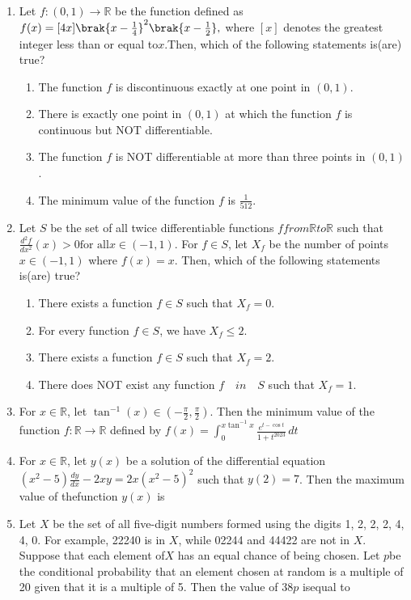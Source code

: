 \documentclass[12pt,a4paper]{article}
\begin{document}
\begin{enumerate}
\item Let $f : (0,1) \to \mathbb{R}$ be the function defined as $ f(x) =  [4x] \brak{x-\frac{1}{4}}^2 \brak{x-\frac{1}{2}},$ where $[x]$ denotes the greatest integer less than or equal to$x.$Then, which of the following statements is(are) true?
\begin{enumerate}
\item The function $f$ is discontinuous exactly at one point in $(0,1)$.
\item There is exactly one point in $(0,1)$ at which the function $f$ is continuous but NOT differentiable.
\item The function $f$ is NOT differentiable at more than three points in $(0,1)$.
\item The minimum value of the function $f$ is $\frac{1}{512}$.
\end{enumerate}

\item Let $S$ be the set of all twice differentiable functions $f from \mathbb{R} to \mathbb{R}$ such that $ \frac{d^2 f}{dx^2}(x) > 0  \text{for all}  x \in (-1, 1).$ For $f \in S$, let ${X_{f}}$ be the number of points $x \in (-1, 1)$ where $f(x) = x$. Then, which of the following statements is(are) true?
\begin{enumerate}
\item There exists a function $f \in S$ such that ${X_{f}} = 0$.
\item For every function $f \in S$, we have ${X_{f}} \leq 2$.
\item There exists a function $f \in S$ such that ${X_{f}} = 2$.
\item There does NOT exist any function $f \quad in \quad S$ such that ${X_{f}} = 1$.
\end{enumerate}

\item For $x \in \mathbb{R}$, let $\tan^{-1}(x) \in \left( -\frac{\pi}{2}, \frac{\pi}{2} \right).$ Then the minimum value of the function $f: \mathbb{R} \to \mathbb{R}$ defined by $f(x) =  \int_0^{x\tan^{-1}x} \frac{e^{t-\cos t}}{1+t^{2023}}\, dt$

\item For $x \in \mathbb{R}$, let $y(x)$ be a solution of the differential equation $ (x^2 - 5) \frac{dy}{dx} - 2xy = 2x{(x^2 - 5)^2}$  such that $y(2) = 7$. Then the maximum value of thefunction $y(x)$ is

\item Let $X$ be the set of all five-digit numbers formed using the digits 1, 2, 2, 2, 4, 4, 0. For example, 22240 is in $X$, while 02244 and 44422 are not in $X$. Suppose that each element of$X$ has an equal chance of being chosen. Let $p$be the conditional probability that an element chosen at random is a multiple of 20 given that it is a multiple of 5. Then the value of $38p$ isequal to


\end{enumerate}
\end{document}
